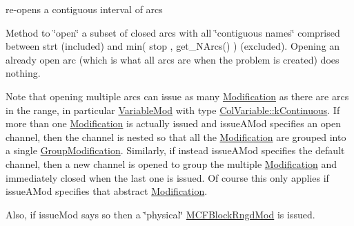 re-\/opens a contiguous interval of arcs 

Method to \char`\"{}open\char`\"{} a subset of closed arcs with all \char`\"{}contiguous names\char`\"{} comprised between strt (included) and min( stop , get\+\_\+\+N\+Arcs() ) (excluded). Opening an already open arc (which is what all arcs are when the problem is created) does nothing.

Note that opening multiple arcs can issue as many \mbox{\hyperlink{class_s_m_spp__di__unipi__it_1_1_modification}{Modification}} as there are arcs in the range, in particular \mbox{\hyperlink{class_s_m_spp__di__unipi__it_1_1_variable_mod}{Variable\+Mod}} with type \mbox{\hyperlink{class_s_m_spp__di__unipi__it_1_1_col_variable_ae6a9c27f20ec8030a1aef0c5b655c4e1abe6ad916b46098fac21a307ea72f206e}{Col\+Variable\+::k\+Continuous}}. If more than one \mbox{\hyperlink{class_s_m_spp__di__unipi__it_1_1_modification}{Modification}} is actually issued and issue\+A\+Mod specifies an open channel, then the channel is nested so that all the \mbox{\hyperlink{class_s_m_spp__di__unipi__it_1_1_modification}{Modification}} are grouped into a single \mbox{\hyperlink{class_s_m_spp__di__unipi__it_1_1_group_modification}{Group\+Modification}}. Similarly, if instead issue\+A\+Mod specifies the default channel, then a new channel is opened to group the multiple \mbox{\hyperlink{class_s_m_spp__di__unipi__it_1_1_modification}{Modification}} and immediately closed when the last one is issued. Of course this only applies if issue\+A\+Mod specifies that abstract \mbox{\hyperlink{class_s_m_spp__di__unipi__it_1_1_modification}{Modification}}.

Also, if issue\+Mod says so then a \char`\"{}physical\char`\"{} \mbox{\hyperlink{class_s_m_spp__di__unipi__it_1_1_m_c_f_block_rngd_mod}{M\+C\+F\+Block\+Rngd\+Mod}} is issued. \mbox{\label{class_s_m_spp__di__unipi__it_1_1_m_c_f_block_a374dc8a46c0ec47bbbfb5b6c02b2b285}} 
